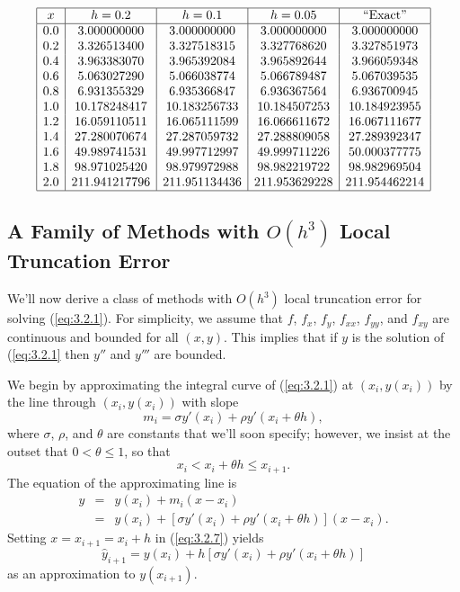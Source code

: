 \documentclass{ximera}
\begin{document}
\begin{example}
\begin{explanation}
$$
\begin{array}{|c|c|c|c|c|}
\hline
x&
h=0.2&
h=0.1&
h=0.05&
\text{``Exact''}\\ \hline
0.0 &   3.000000000 &  3.000000000  &   3.000000000 &   3.000000000 \\
0.2 &   3.326513400 &  3.327518315  &   3.327768620 &   3.327851973 \\
0.4 &   3.963383070 &  3.965392084  &   3.965892644 &   3.966059348 \\
0.6 &   5.063027290 &  5.066038774  &   5.066789487 &   5.067039535 \\
0.8 &   6.931355329 &  6.935366847  &   6.936367564 &   6.936700945 \\
1.0 &  10.178248417 & 10.183256733  &  10.184507253 &  10.184923955 \\
1.2 &  16.059110511 & 16.065111599  &  16.066611672 &  16.067111677 \\
1.4 &  27.280070674 & 27.287059732  &  27.288809058 &  27.289392347 \\
1.6 &  49.989741531 & 49.997712997  &  49.999711226 &  50.000377775 \\
1.8 &  98.971025420 & 98.979972988  &  98.982219722 &  98.982969504 \\
2.0 & 211.941217796 &211.951134436  & 211.953629228 & 211.954462214 \\
\hline
\end{array}
$$
\end{explanation}
\end{example}


\subsection*{A Family of Methods with $O(h^3)$ Local Truncation Error}

We'll now derive a class of methods with $O(h^3)$ local truncation
error for solving (\ref{eq:3.2.1}). For simplicity, we
assume that $f$, $f_x$, $f_y$, $f_{xx}$, $f_{yy}$, and $f_{xy}$ are
continuous and bounded for all $(x,y)$. This implies that if $y$ is
the solution of (\ref{eq:3.2.1} then $y''$ and $y'''$ are bounded.

We begin by approximating the integral curve of (\ref{eq:3.2.1}) at
$(x_i,y(x_i))$ by the line through $(x_i,y(x_i))$ with slope
$$
m_i=\sigma y'(x_i)+\rho y'(x_i+\theta h),
$$
where $\sigma$, $\rho$, and $\theta$ are constants that we'll soon
specify;     however, we insist at the outset that $0<\theta\leq 1$, so
that
$$
x_i<x_i+\theta h\leq x_{i+1}.
$$
The equation of the approximating line is
\begin{equation} \label{eq:3.2.7}
\begin{array}{rcl}
y&=&y(x_i)+m_i(x-x_i)\\
&=&y(x_i)+\left[\sigma y'(x_i)+\rho y'(x_i+\theta h)\right](x-x_i).
\end{array}
\end{equation}
Setting $x=x_{i+1}=x_i+h$ in (\ref{eq:3.2.7}) yields
$$
\hat y_{i+1}=y(x_i)+h\left[\sigma y'(x_i)+\rho y'(x_i+\theta h)\right]
$$
as an approximation to $y(x_{i+1})$.
\end{document}
